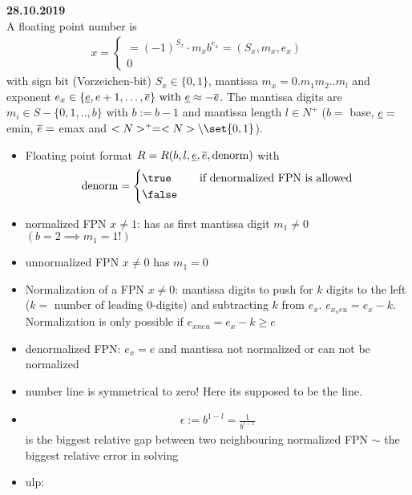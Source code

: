 \textbf{28.10.2019}\\
A floating point number is 
\begin{align*}
	x = \begin{cases}
	= (-1)^{S_x}\cdot m_xb^{e_x}=(S_x,m_x,e_x) &\quad \\
	0 \quad
	\end{cases}
\end{align*}
with sign bit (Vorzeichen-bit) $S_x\in \{0,1\}$, mantissa $m_x=0.m_1m_2..m_l$ and exponent $e_x\in \{\underline{e},e+1,\dots,\overline{e}\} \text{ with } \underline{e} \approx -\overline{e}$. The mantissa digits are $m_i\in S-\{0,1,..,b\}$ with $b:=b-1$ and mantissa length $l\in N^+$ ($b =$ base, $\underline{e} =$ emin, $\overline{e} =$ emax and $\N^+ = \N\setminus \set{0,1}$).
\begin{itemize}
    \item  Floating point format $R=R(b,l,\underline{e},\overline{e},\operatorname{denorm})$
    with
    \begin{align*}
    	\denorm = \begin{cases}
    		\true &\quad\text{if denormalized FPN is allowed}\\
    		\false &\quad\\
    	\end{cases}
    \end{align*}
  \item normalized FPN $x\neq 1$: has as first mantissa digit $m_1\neq 0$ $(b=2 \implies m_1=1!)$
  \item unnormalized FPN $x\neq0$ has $m_1=0$
  \item Normalization of a FPN $x \neq 0$: mantissa digits to push for $k$ digits to the left ($k =$  number of leading 0-digits) and subtracting $k$ from $e_x$. $e_{x_neu}=e_x-k$.
  \newline Normalization is only possible if $e_{xneu} = e_x-k \geqslant e$
  \item denormalized FPN: $e_x = e$ and mantissa not normalized or can not be normalized
  \item number line is symmetrical to zero! Here its supposed to be the line.
  \item {}
  \begin{align*}
  	\epsilon:=b^{1-l}=\frac{1}{b^{l-1}}
  \end{align*}
  is the biggest relative gap between two neighbouring normalized FPN $\sim$ the biggest relative error in solving 
  \item {} ulp:

\end{itemize}
